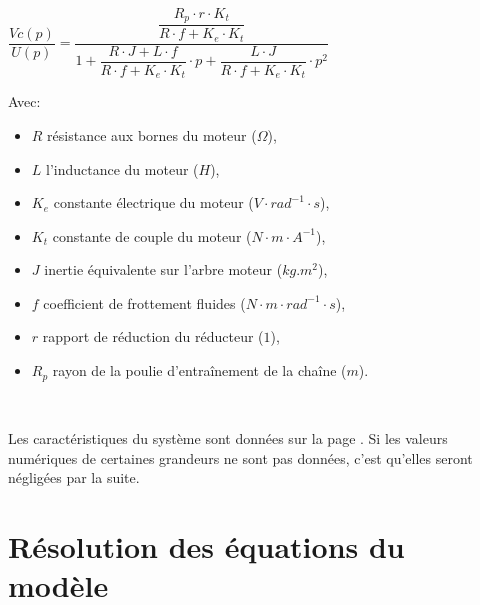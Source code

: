 \begin{center}
 $\dfrac{Vc(p)}{U(p)}=\dfrac{\dfrac{R_p\cdot r\cdot K_t}{R\cdot f +K_e\cdot K_t}}{1+\dfrac{R\cdot J+L\cdot f}{R\cdot f +K_e\cdot K_t}\cdot p+\dfrac{L\cdot J}{R\cdot f +K_e\cdot K_t}\cdot p^2}$
\end{center}

Avec:
\begin{itemize}
 \item $R$ résistance aux bornes du moteur ($\Omega$),
 \item $L$ l'inductance du moteur ($H$),
 \item $K_e$ constante électrique du moteur ($V\cdot rad^{-1}\cdot s$),
 \item $K_t$ constante de couple du moteur ($N\cdot m\cdot A^{-1}$),
 \item $J$ inertie équivalente sur l'arbre moteur ($kg.m^2$),
 \item $f$ coefficient de frottement fluides ($N\cdot m\cdot rad^{-1}\cdot s$),
 \item $r$ rapport de réduction du réducteur ($1$),
 \item $R_p$ rayon de la poulie d'entraînement de la chaîne ($m$).
\end{itemize}

~\

Les caractéristiques du système sont données sur la page \urlsysteme. Si les valeurs numériques de certaines grandeurs ne sont pas données, c'est qu'elles seront négligées par la suite.






\section{Résolution des équations du modèle}

